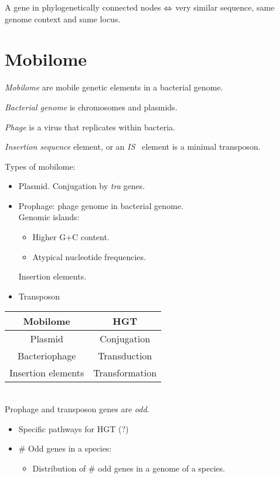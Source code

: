 \documentclass[10pt,a4paper]{article}
\theoremstyle{plain} \newtheorem{Lem}{Lemma}
\begin{document}
A gene in phylogenetically connected nodes $\Leftrightarrow$ very similar sequence, same genome context and same locus.



\section{Mobilome}
{\em Mobilome} are mobile genetic elements in a bacterial genome.

{\em Bacterial genome} is chromosomes and plasmids.

{\em Phage} is a virus that replicates within bacteria.

{\em Insertion sequence} element, or an {\em IS} \ element is a minimal transposon.

Types of mobilome:
\begin{itemize}
  \item Plasmid. Conjugation by {\em tra} genes.
  \item Prophage: phage genome in bacterial genome. 
        \\
        Genomic islands:
        \begin{itemize}
          \item Higher G+C content.
          \item Atypical nucleotide frequencies.
        \end{itemize}
        Insertion elements.
  \item Transposon
\end{itemize}

\begin{tabular}{|c|c|}
\hline Mobilome & HGT \\
\hline 
\hline Plasmid & Conjugation \\
\hline Bacteriophage & Transduction \\
\hline Insertion elements & Transformation \\
\hline
\end{tabular}
\\


Prophage and transposon genes are {\em odd}.


\Questions
\begin{itemize}
  \item Specific pathways for HGT (?)
  \item \# Odd genes in a species:
    \begin{itemize}
  	  \item Distribution of \# odd genes in a genome of a species.
    \end{itemize}
\end{itemize}
\end{document}
